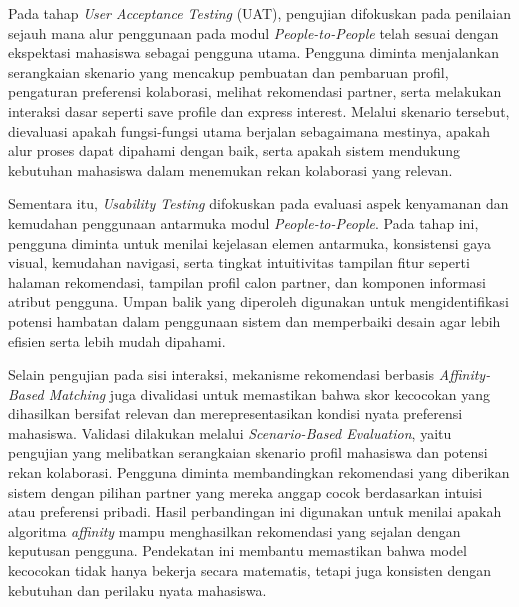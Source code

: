 Pada tahap \textit{User Acceptance Testing} (UAT), pengujian difokuskan pada penilaian sejauh mana alur penggunaan pada modul \textit{People-to-People} telah sesuai dengan ekspektasi mahasiswa sebagai pengguna utama. Pengguna diminta menjalankan serangkaian skenario yang mencakup pembuatan dan pembaruan profil, pengaturan preferensi kolaborasi, melihat rekomendasi partner, serta melakukan interaksi dasar seperti save profile dan express interest. Melalui skenario tersebut, dievaluasi apakah fungsi-fungsi utama berjalan sebagaimana mestinya, apakah alur proses dapat dipahami dengan baik, serta apakah sistem mendukung kebutuhan mahasiswa dalam menemukan rekan kolaborasi yang relevan.

Sementara itu, \textit{Usability Testing} difokuskan pada evaluasi aspek kenyamanan dan kemudahan penggunaan antarmuka modul \textit{People-to-People}. Pada tahap ini, pengguna diminta untuk menilai kejelasan elemen antarmuka, konsistensi gaya visual, kemudahan navigasi, serta tingkat intuitivitas tampilan fitur seperti halaman rekomendasi, tampilan profil calon partner, dan komponen informasi atribut pengguna. Umpan balik yang diperoleh digunakan untuk mengidentifikasi potensi hambatan dalam penggunaan sistem dan memperbaiki desain agar lebih efisien serta lebih mudah dipahami.

Selain pengujian pada sisi interaksi, mekanisme rekomendasi berbasis \textit{Affinity-Based Matching} juga divalidasi untuk memastikan bahwa skor kecocokan yang dihasilkan bersifat relevan dan merepresentasikan kondisi nyata preferensi mahasiswa. Validasi dilakukan melalui \textit{Scenario-Based Evaluation}, yaitu pengujian yang melibatkan serangkaian skenario profil mahasiswa dan potensi rekan kolaborasi. Pengguna diminta membandingkan rekomendasi yang diberikan sistem dengan pilihan partner yang mereka anggap cocok berdasarkan intuisi atau preferensi pribadi. Hasil perbandingan ini digunakan untuk menilai apakah algoritma \textit{affinity} mampu menghasilkan rekomendasi yang sejalan dengan keputusan pengguna. Pendekatan ini membantu memastikan bahwa model kecocokan tidak hanya bekerja secara matematis, tetapi juga konsisten dengan kebutuhan dan perilaku nyata mahasiswa.

